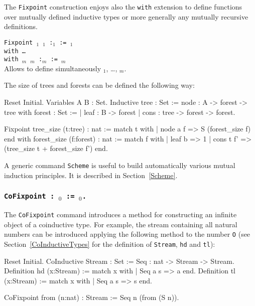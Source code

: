 The {\tt Fixpoint} construction enjoys also the {\tt with} extension
to define functions over mutually defined inductive types or more
generally any mutually recursive definitions.

\begin{Variants}
\item {\tt Fixpoint {\ident$_1$} {\params$_1$} :{\type$_1$} := {\term$_1$}\\
        with {\ldots} \\
        with {\ident$_m$} {\params$_m$} :{\type$_m$} :=  {\type$_m$}}\\
        Allows to define simultaneously {\ident$_1$}, {\ldots},
        {\ident$_m$}.
\end{Variants}

\Example 
The size of trees and forests can be defined the following way: 
\begin{coq_eval}
Reset Initial.
Variables A B : Set.
Inductive tree : Set :=
    node : A -> forest -> tree
with forest : Set :=
  | leaf : B -> forest
  | cons : tree -> forest -> forest.
\end{coq_eval}
\begin{coq_example*}
Fixpoint tree_size (t:tree) : nat :=
  match t with
  | node a f => S (forest_size f)
  end
 with forest_size (f:forest) : nat :=
  match f with
  | leaf b => 1
  | cons t f' => (tree_size t + forest_size f')
  end.
\end{coq_example*}
A generic command {\tt Scheme} is useful to build automatically various
mutual induction principles. It is described in Section~\ref{Scheme}.

\subsubsection{\tt CoFixpoint {\ident} : \type$_0$ := \term$_0$.
\label{CoFixpoint}}

The {\tt CoFixpoint} command introduces a method for constructing an
infinite object of a coinduc\-tive type. For example, the stream
containing all natural numbers can be introduced applying the
following method to the number \texttt{O} (see
Section~\ref{CoInductiveTypes} for the definition of {\tt Stream},
{\tt hd} and {\tt tl}):
\begin{coq_eval}
Reset Initial.
CoInductive Stream : Set :=
    Seq : nat -> Stream -> Stream.
Definition hd (x:Stream) := match x with
                            | Seq a s => a
                            end.
Definition tl (x:Stream) := match x with
                            | Seq a s => s
                            end.
\end{coq_eval}
\begin{coq_example}
CoFixpoint from (n:nat) : Stream := Seq n (from (S n)).
\end{coq_example}

